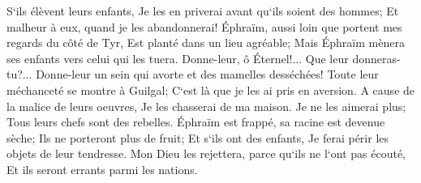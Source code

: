 \verse S`ils élèvent leurs enfants, Je les en priverai avant qu`ils soient des hommes; Et malheur à eux, quand je les abandonnerai! 
\verse Éphraïm, aussi loin que portent mes regards du côté de Tyr, Est planté dans un lieu agréable; Mais Éphraïm mènera ses enfants vers celui qui les tuera. 
\verse Donne-leur, ô Éternel!... Que leur donneras-tu?... Donne-leur un sein qui avorte et des mamelles desséchées! 
\verse Toute leur méchanceté se montre à Guilgal; C`est là que je les ai pris en aversion. A cause de la malice de leurs oeuvres, Je les chasserai de ma maison. Je ne les aimerai plus; Tous leurs chefs sont des rebelles. 
\verse Éphraïm est frappé, sa racine est devenue sèche; Ils ne porteront plus de fruit; Et s`ils ont des enfants, Je ferai périr les objets de leur tendresse. 
\verse Mon Dieu les rejettera, parce qu`ils ne l`ont pas écouté, Et ils seront errants parmi les nations. 

